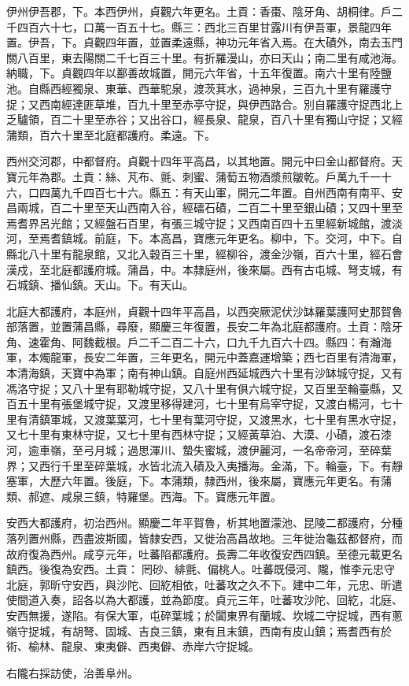 \begin{pinyinscope}
 伊州伊吾郡，下。本西伊州，貞觀六年更名。土貢：香棗、陰牙角、胡桐律。戶二千四百六十七，口萬一百五十七。縣三：西北三百里甘露川有伊吾軍，景龍四年置。伊吾，下。貞觀四年置，並置柔遠縣，神功元年省入焉。在大磧外，南去玉門關八百里，東去陽關二千七百三十里。有折羅漫山，亦曰天山；南二里有咸池海。納職，下。貞觀四年以鄯善故城置，開元六年省，十五年復置。南六十里有陸鹽池。自縣西經獨泉、東華、西華駝泉，渡茨萁水，過神泉，三百九十里有羅護守捉；又西南經達匪草堆，百九十里至赤亭守捉，與伊西路合。別自羅護守捉西北上乏驢領，百二十里至赤谷；又出谷口，經長泉、龍泉，百八十里有獨山守捉；又經蒲類，百六十里至北庭都護府。柔遠。下。



 西州交河郡，中都督府。貞觀十四年平高昌，以其地置。開元中曰金山都督府。天寶元年為郡。土貢：絲、芃布、氈、刺蜜、蒲萄五物酒漿煎皺乾。戶萬九千一十六，口四萬九千四百七十六。縣五：有天山軍，開元二年置。自州西南有南平、安昌兩城，百二十里至天山西南入谷，經礌石磧，二百二十里至銀山磧；又四十里至焉耆界呂光館；又經盤石百里，有張三城守捉；又西南百四十五里經新城館，渡淡河，至焉耆鎮城。前庭，下。本高昌，寶應元年更名。柳中，下。交河，中下。自縣北八十里有龍泉館，又北入穀百三十里，經柳谷，渡金沙嶺，百六十里，經石會漢戍，至北庭都護府城。蒲昌，中。本隸庭州，後來屬。西有古屯城、弩支城，有石城鎮、播仙鎮。天山。下。有天山。



 北庭大都護府，本庭州，貞觀十四年平高昌，以西突厥泥伏沙缽羅葉護阿史那賀魯部落置，並置蒲昌縣，尋廢，顯慶三年復置，長安二年為北庭都護府。土貢：陰牙角、速霍角、阿魏截根。戶二千二百二十六，口九千九百六十四。縣四：有瀚海軍，本燭龍軍，長安二年置，三年更名，開元中蓋嘉運增築；西七百里有清海軍，本清海鎮，天寶中為軍；南有神山鎮。自庭州西延城西六十里有沙缽城守捉，又有馮洛守捉；又八十里有耶勒城守捉，又八十里有俱六城守捉，又百里至輪臺縣，又百五十里有張堡城守捉，又渡里移得建河，七十里有烏宰守捉，又渡白楊河，七十里有清鎮軍城，又渡葉葉河，七十里有葉河守捉，又渡黑水，七十里有黑水守捉，又七十里有東林守捉，又七十里有西林守捉；又經黃草泊、大漠、小磧，渡石漆河，逾車嶺，至弓月城；過思渾川、蟄失蜜城，渡伊麗河，一名帝帝河，至碎葉界；又西行千里至碎葉城，水皆北流入磧及入夷播海。金滿，下。輪臺，下。有靜塞軍，大歷六年置。後庭，下。本蒲類，隸西州，後來屬，寶應元年更名。有蒲類、郝遮、咸泉三鎮，特羅堡。西海。下。寶應元年置。



 安西大都護府，初治西州。顯慶二年平賀魯，析其地置濛池、昆陵二都護府，分種落列置州縣，西盡波斯國，皆隸安西，又徙治高昌故地。三年徙治龜茲都督府，而故府復為西州。咸亨元年，吐蕃陷都護府。長壽二年收復安西四鎮。至德元載更名鎮西。後復為安西。土貢：罔砂、緋氈、偏桃人。吐蕃既侵河、隴，惟李元忠守北庭，郭昕守安西，與沙陀、回紇相依，吐蕃攻之久不下。建中二年，元忠、昕遣使間道入奏，詔各以為大都護，並為節度。貞元三年，吐蕃攻沙陀、回紇，北庭、安西無援，遂陷。有保大軍，屯碎葉城；於闐東界有蘭城、坎城二守捉城，西有蔥嶺守捉城，有胡弩、固城、吉良三鎮，東有且末鎮，西南有皮山鎮；焉耆西有於術、榆林、龍泉、東夷僻、西夷僻、赤岸六守捉城。



 右隴右採訪使，治善阜州。



\end{pinyinscope}